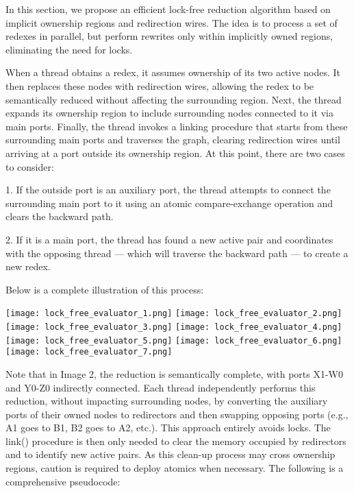 \documentclass{article}
\begin{document}
In this section, we propose an efficient lock-free reduction algorithm based on implicit ownership regions and redirection wires. The idea is to process a set of redexes in parallel, but perform rewrites only within implicitly owned regions, eliminating the need for locks.

When a thread obtains a redex, it assumes ownership of its two active nodes. It then replaces these nodes with redirection wires, allowing the redex to be semantically reduced without affecting the surrounding region. Next, the thread expands its ownership region to include surrounding nodes connected to it via main ports. Finally, the thread invokes a linking procedure that starts from these surrounding main ports and traverses the graph, clearing redirection wires until arriving at a port outside its ownership region. At this point, there are two cases to consider:

1. If the outside port is an auxiliary port, the thread attempts to connect the surrounding main port to it using an atomic compare-exchange operation and clears the backward path.

2. If it is a main port, the thread has found a new active pair and coordinates with the opposing thread — which will traverse the backward path — to create a new redex.

Below is a complete illustration of this process:

\texttt{[image: lock\_free\_evaluator\_1.png]}
\texttt{[image: lock\_free\_evaluator\_2.png]}
\texttt{[image: lock\_free\_evaluator\_3.png]}
\texttt{[image: lock\_free\_evaluator\_4.png]}
\texttt{[image: lock\_free\_evaluator\_5.png]}
\texttt{[image: lock\_free\_evaluator\_6.png]}
\texttt{[image: lock\_free\_evaluator\_7.png]}

Note that in Image 2, the reduction is semantically complete, with ports X1-W0 and Y0-Z0 indirectly connected. Each thread independently performs this reduction, without impacting surrounding nodes, by converting the auxiliary ports of their owned nodes to redirectors and then swapping opposing ports (e.g., A1 goes to B1, B2 goes to A2, etc.). This approach entirely avoids locks. The link() procedure is then only needed to clear the memory occupied by redirectors and to identify new active pairs. As this clean-up process may cross ownership regions, caution is required to deploy atomics when necessary. The following is a comprehensive pseudocode:
\end{document}
